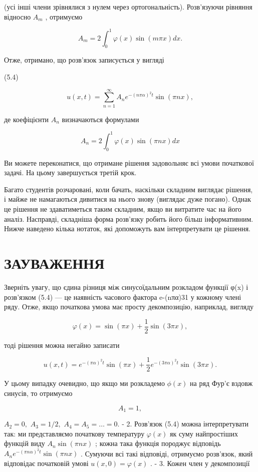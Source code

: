 \documentclass[
  ukrainian,
]{article}
\begin{document}
(усі інші члени зрівнялися з нулем через ортогональність). Розв'язуючи
рівняння відносно \(A_m\) , отримуємо

\[
A_m = 2 \int_0^1 \varphi(x) \sin(m\pi x) dx.
\]

Отже, отримано, що розв'язок записується у вигляді

(5.4)

\[
u(x, t) = \sum_{n=1}^{\infty} A_n e^{-(n\pi\alpha)^2 t} \sin(\pi n x),
\]

де коефіцієнти \(A_n\) визначаються формулами

\[
A_n = 2\int_0^1 \varphi(x) \sin(\pi nx) dx
\]

Ви можете переконатися, що отримане рішення задовольняє всі умови
початкової задачі. На цьому завершується третій крок.

Багато студентів розчаровані, коли бачать, наскільки складним виглядає
рішення, і майже не намагаються дивитися на нього знову (виглядає дуже
погано). Однак це рішення не здаватиметься таким складним, якщо ви
витратите час на його аналіз. Насправді, складніша форма розв'язку
робить його більш інформативним. Нижче наведено кілька нотаток, які
допоможуть вам інтерпретувати це рішення.

\section{ЗАУВАЖЕННЯ}\label{ux437ux430ux443ux432ux430ux436ux435ux43dux43dux44f-4}

Зверніть увагу, що єдина різниця між синусоїдальним розкладом функції
φ(x) і розв'язком (5.4) --- це наявність часового фактора e-(nπα)31 у
кожному члені ряду. Отже, якщо початкова умова має просту декомпозицію,
наприклад, вигляду

\[
\varphi(x) = \sin(\pi x) + \frac{1}{2}\sin(3\pi x),
\]

тоді рішення можна негайно записати

\[
u(x, t) = e^{-(\pi\alpha)^2 t} \sin(\pi x) + \frac{1}{2} e^{-(3\pi\alpha)^2 t} \sin(3\pi x).
\]

У цьому випадку очевидно, що якщо ми розкладемо \(\phi(x)\) на ряд Фур'є
вздовж синусів, то отримуємо

\[
A_1 = 1,
\]

\(A_2 = 0,\) \(A_3 = 1/2,\) \(A_4 = A_5 = \dots = 0.\) - 2. Розв'язок
(5.4) можна інтерпретувати так: ми представляємо початкову температуру
\(\varphi(x)\) як суму найпростіших функцій виду \(A_n \sin(\pi nx)\) ;
кожна така функція породжує відповідь
\(A_n e^{-(\pi n\alpha)^2 t} \sin(\pi nx)\) . Сумуючи всі такі
відповіді, отримуємо розв'язок, який відповідає початковій умові
\(u(x, 0) = \varphi(x)\) . - 3. Кожен член у декомпозиції
\end{document}
